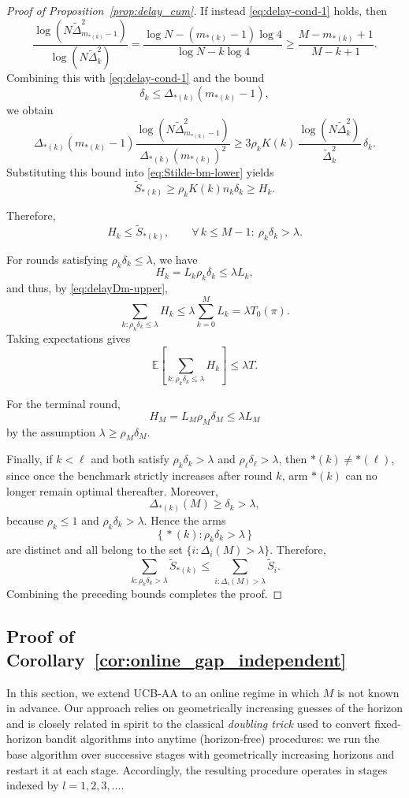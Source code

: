 \documentclass[11pt]{article}
\begin{document}
\begin{proof}[Proof of Proposition~\ref{prop:delay_cum}]
If instead \eqref{eq:delay-cond-1} holds, then
\[
\frac{\log(N\tilde{\Delta}_{m_{*(k)}-1}^2)}
{\log(N\tilde{\Delta}_k^2)}
=
\frac{\log N-(m_{*(k)}-1)\log 4}{\log N-k\log 4}
\ge
\frac{M-m_{*(k)}+1}{M-k+1}.
\]
Combining this with \eqref{eq:delay-cond-1} and the bound
\[
\delta_k\le \Delta_{*(k)}(m_{*(k)}-1),
\]
we obtain
\[
\Delta_{*(k)}(m_{*(k)}-1)
\frac{\log(N\tilde{\Delta}_{m_{*(k)}-1}^2)}
{\Delta_{*(k)}(m_{*(k)})^2}
\ge
3\rho_k K(k)\,
\frac{\log(N\tilde{\Delta}_k^2)}{\tilde{\Delta}_k^2}\,\delta_k.
\]
Substituting this bound into \eqref{eq:Stilde-bm-lower} yields
\[
\tilde S_{*(k)}
\ge
\rho_k K(k)n_k\delta_k
\ge
H_k.
\]

Therefore,
\[
H_k\le \tilde S_{*(k)},
\qquad
\forall\,k\le M-1:\ \rho_k\delta_k>\lambda.
\]

For rounds satisfying $\rho_k\delta_k\le \lambda$, we have
\[
H_k=L_k\rho_k\delta_k\le \lambda L_k,
\]
and thus, by \eqref{eq:delayDm-upper},
\[
\sum_{k:\rho_k\delta_k\le \lambda}H_k
\le
\lambda\sum_{k=0}^{M}L_k
=
\lambda T_0(\pi).
\]
Taking expectations gives
\[
\mathbb{E}\left[\sum_{k:\rho_k\delta_k\le \lambda}H_k\right]
\le
\lambda T.
\]

For the terminal round,
\[
H_M=L_M\rho_M\delta_M\le \lambda L_M
\]
by the assumption $\lambda\ge \rho_M\delta_M$.

Finally, if $k<\ell$ and both satisfy $\rho_k\delta_k>\lambda$ and $\rho_\ell\delta_\ell>\lambda$,
then $*(k)\neq *(\ell)$, since once the benchmark strictly increases after round $k$, arm $*(k)$
can no longer remain optimal thereafter. Moreover,
\[
\Delta_{*(k)}(M)\ge \delta_k>\lambda,
\]
because $\rho_k\le 1$ and $\rho_k\delta_k>\lambda$. Hence the arms
\[
\{\,*(k):\rho_k\delta_k>\lambda\,\}
\]
are distinct and all belong to the set $\{i:\Delta_i(M)>\lambda\}$. Therefore,
\[
\sum_{k:\rho_k\delta_k>\lambda}\tilde S_{*(k)}
\le
\sum_{i:\Delta_i(M)>\lambda}\tilde S_i.
\]
Combining the preceding bounds completes the proof.
\end{proof}

\subsection{Proof of Corollary~\ref{cor:online_gap_independent}}
\label{sec:Proof of cor:online_gap_independent}

In this section, we extend UCB-AA to an online regime in which $M$ is not known in advance. Our approach relies on geometrically increasing guesses of the horizon and is closely related in spirit to the classical \emph{doubling trick} used to convert fixed-horizon bandit algorithms into anytime (horizon-free) procedures: we run the base algorithm over successive stages with geometrically increasing horizons and restart it at each stage. Accordingly, the resulting procedure operates in stages indexed by $l=1, 2, 3, \ldots$.
\end{document}
